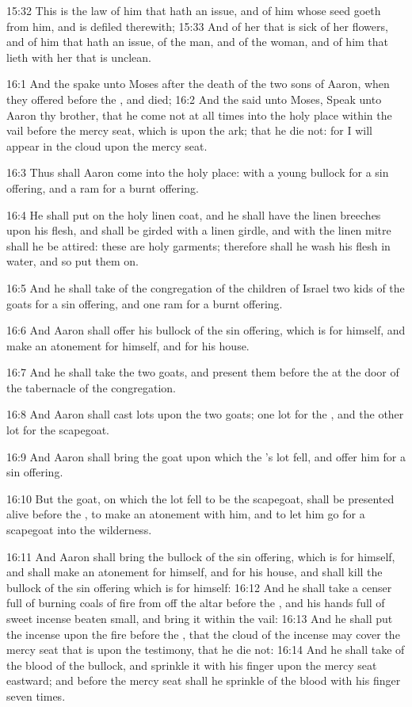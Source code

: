 15:32 This is the law of him that hath an issue, and of him whose seed goeth from him, and is defiled therewith; 15:33 And of her that is sick of her flowers, and of him that hath an issue, of the man, and of the woman, and of him that lieth with her that is unclean.

16:1 And the \LORD spake unto Moses after the death of the two sons of Aaron, when they offered before the \LORD, and died; 16:2 And the \LORD said unto Moses, Speak unto Aaron thy brother, that he come not at all times into the holy place within the vail before the mercy seat, which is upon the ark; that he die not: for I will appear in the cloud upon the mercy seat.

16:3 Thus shall Aaron come into the holy place: with a young bullock for a sin offering, and a ram for a burnt offering.

16:4 He shall put on the holy linen coat, and he shall have the linen breeches upon his flesh, and shall be girded with a linen girdle, and with the linen mitre shall he be attired: these are holy garments; therefore shall he wash his flesh in water, and so put them on.

16:5 And he shall take of the congregation of the children of Israel two kids of the goats for a sin offering, and one ram for a burnt offering.

16:6 And Aaron shall offer his bullock of the sin offering, which is for himself, and make an atonement for himself, and for his house.

16:7 And he shall take the two goats, and present them before the \LORD at the door of the tabernacle of the congregation.

16:8 And Aaron shall cast lots upon the two goats; one lot for the \LORD, and the other lot for the scapegoat.

16:9 And Aaron shall bring the goat upon which the \LORD's lot fell, and offer him for a sin offering.

16:10 But the goat, on which the lot fell to be the scapegoat, shall be presented alive before the \LORD, to make an atonement with him, and to let him go for a scapegoat into the wilderness.

16:11 And Aaron shall bring the bullock of the sin offering, which is for himself, and shall make an atonement for himself, and for his house, and shall kill the bullock of the sin offering which is for himself: 16:12 And he shall take a censer full of burning coals of fire from off the altar before the \LORD, and his hands full of sweet incense beaten small, and bring it within the vail: 16:13 And he shall put the incense upon the fire before the \LORD, that the cloud of the incense may cover the mercy seat that is upon the testimony, that he die not: 16:14 And he shall take of the blood of the bullock, and sprinkle it with his finger upon the mercy seat eastward; and before the mercy seat shall he sprinkle of the blood with his finger seven times.


